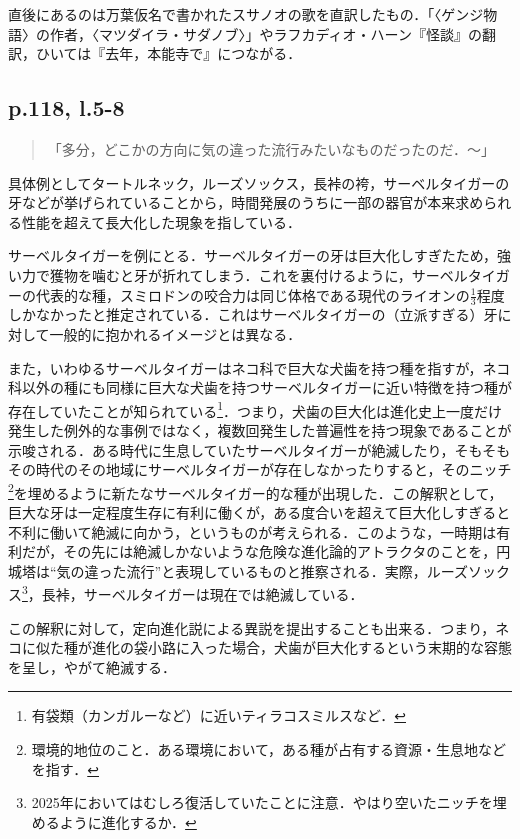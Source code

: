 \documentclass[10pt, a5paper, twoside]{ltjsarticle}
\begin{document}
                直後にあるのは万葉仮名で書かれたスサノオの歌を直訳したもの．「〈ゲンジ物語〉の作者，〈マツダイラ・サダノブ〉」やラフカディオ・ハーン『怪談』の翻訳，ひいては『去年，本能寺で』につながる．

        \subsection{p.118, l.5-8}

            \begin{quote}
                「多分，どこかの方向に気の違った流行みたいなものだったのだ．〜」
            \end{quote}

            具体例としてタートルネック，ルーズソックス，長裃の袴，サーベルタイガーの牙などが挙げられていることから，時間発展のうちに一部の器官が本来求められる性能を超えて長大化した現象を指している．

            サーベルタイガーを例にとる．サーベルタイガーの牙は巨大化しすぎたため，強い力で獲物を噛むと牙が折れてしまう．これを裏付けるように，サーベルタイガーの代表的な種，スミロドンの咬合力は同じ体格である現代のライオンの$\displaystyle\frac{1}{3}$程度しかなかったと推定されている\cite{sabercat}．これはサーベルタイガーの（立派すぎる）牙に対して一般的に抱かれるイメージとは異なる．

            また，いわゆるサーベルタイガーはネコ科で巨大な犬歯を持つ種を指すが，ネコ科以外の種にも同様に巨大な犬歯を持つサーベルタイガーに近い特徴を持つ種が存在していたことが知られている\footnote{有袋類（カンガルーなど）に近いティラコスミルスなど．}．つまり，犬歯の巨大化は進化史上一度だけ発生した例外的な事例ではなく，複数回発生した普遍性を持つ現象であることが示唆される．ある時代に生息していたサーベルタイガーが絶滅したり，そもそもその時代のその地域にサーベルタイガーが存在しなかったりすると，そのニッチ\footnote{環境的地位のこと．ある環境において，ある種が占有する資源・生息地などを指す．}を埋めるように新たなサーベルタイガー的な種が出現した．この解釈として，巨大な牙は一定程度生存に有利に働くが，ある度合いを超えて巨大化しすぎると不利に働いて絶滅に向かう，というものが考えられる．このような，一時期は有利だが，その先には絶滅しかないような危険な進化論的アトラクタのことを，円城塔は“気の違った流行”と表現しているものと推察される．実際，ルーズソックス\footnote{2025年においてはむしろ復活していたことに注意．やはり空いたニッチを埋めるように進化するか．}，長裃，サーベルタイガーは現在では絶滅している．

            この解釈に対して，定向進化説による異説を提出することも出来る．つまり，ネコに似た種が進化の袋小路に入った場合，犬歯が巨大化するという末期的な容態を呈し，やがて絶滅する．
\end{document}
